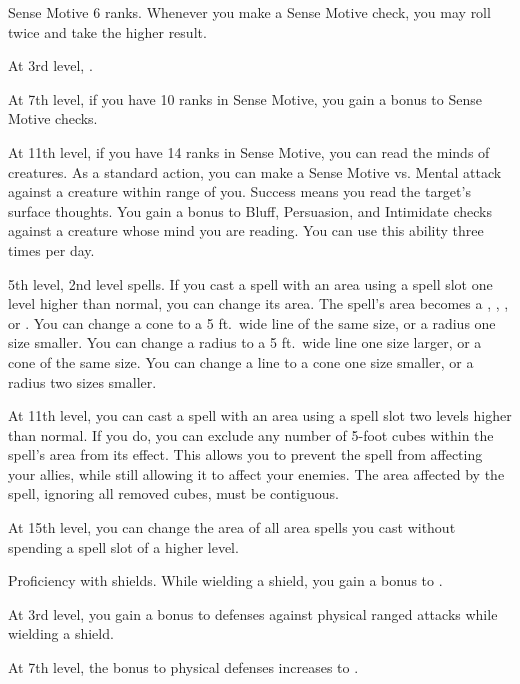     \featpre Sense Motive 6 ranks.
    \featben Whenever you make a Sense Motive check, you may roll twice and take the higher result.

    At 3rd level, \tdash.

    At 7th level, if you have 10 ranks in Sense Motive, you gain a  bonus to Sense Motive checks.

    At 11th level, if you have 14 ranks in Sense Motive, you can read the minds of creatures.
    As a standard action, you can make a Sense Motive vs. Mental attack against a creature within \rngmed range of you.
    Success means you read the target's surface thoughts.
    You gain a  bonus to Bluff, Persuasion, and Intimidate checks against a creature whose mind you are reading.
    You can use this ability three times per day.
    \magical

    \featpre 5th level, 2nd level spells.
    \featben If you cast a spell with an area using a spell slot one level higher than normal, you can change its area.
    The spell's area becomes a \areasmall, \areamed, \arealarge, or \areahuge {}.
    You can change a cone to a 5 ft.\ wide line of the same size, or a radius one size smaller.
    You can change a radius to a 5 ft.\ wide line one size larger, or a cone of the same size.
    You can change a line to a cone one size smaller, or a radius two sizes smaller.

    At 11th level, you can cast a spell with an area using a spell slot two levels higher than normal.
    If you do, you can exclude any number of 5-foot cubes within the spell's area from its effect.
    This allows you to prevent the spell from affecting your allies, while still allowing it to affect your enemies.
    The area affected by the spell, ignoring all removed cubes, must be contiguous.

    At 15th level, you can change the area of all area spells you cast without spending a spell slot of a higher level.

    \featpre Proficiency with shields.
    \featben While wielding a shield, you gain a  bonus to .

    At 3rd level, you gain a  bonus to defenses against physical ranged attacks while wielding a shield.

    At 7th level, the bonus to physical defenses increases to .

